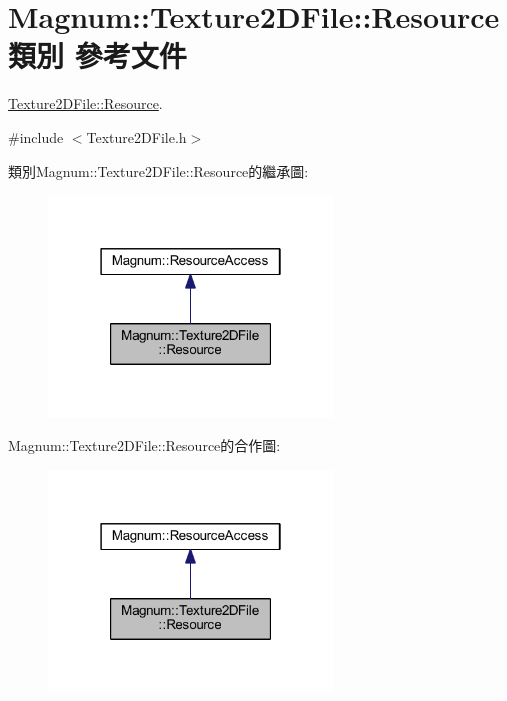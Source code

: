 \hypertarget{class_magnum_1_1_texture2_d_file_1_1_resource}{}\section{Magnum\+:\+:Texture2\+D\+File\+:\+:Resource 類別 參考文件}
\label{class_magnum_1_1_texture2_d_file_1_1_resource}


\hyperlink{class_magnum_1_1_texture2_d_file_1_1_resource}{Texture2\+D\+File\+::\+Resource}.  




{\ttfamily \#include $<$Texture2\+D\+File.\+h$>$}



類別\+Magnum\+:\+:Texture2\+D\+File\+:\+:Resource的繼承圖\+:\nopagebreak
\begin{figure}[H]
\begin{center}
\leavevmode
\includegraphics[width=214pt]{class_magnum_1_1_texture2_d_file_1_1_resource__inherit__graph}
\end{center}
\end{figure}


Magnum\+:\+:Texture2\+D\+File\+:\+:Resource的合作圖\+:\nopagebreak
\begin{figure}[H]
\begin{center}
\leavevmode
\includegraphics[width=214pt]{class_magnum_1_1_texture2_d_file_1_1_resource__coll__graph}
\end{center}
\end{figure}
